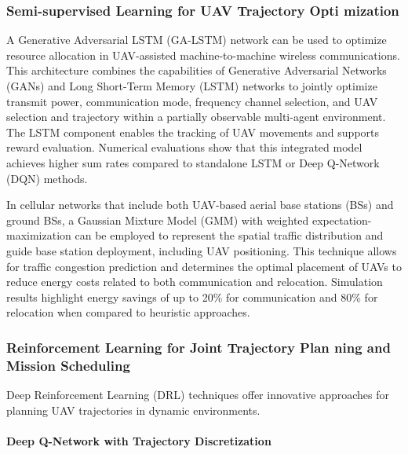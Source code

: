 
\subsubsection{ Semi-supervised Learning for UAV Trajectory Opti
mization}



A Generative Adversarial LSTM (GA-LSTM) network can be used to optimize resource allocation in UAV-assisted machine-to-machine wireless communications. This architecture combines the capabilities of Generative Adversarial Networks (GANs) and Long Short-Term Memory (LSTM) networks to jointly optimize transmit power, communication mode, frequency channel selection, and UAV selection and trajectory within a partially observable multi-agent environment. The LSTM component enables the tracking of UAV movements and supports reward evaluation. Numerical evaluations show that this integrated model achieves higher sum rates compared to standalone LSTM or Deep Q-Network (DQN) methods.

In cellular networks that include both UAV-based aerial base stations (BSs) and ground BSs, a Gaussian Mixture Model (GMM) with weighted expectation-maximization can be employed to represent the spatial traffic distribution and guide base station deployment, including UAV positioning. This technique allows for traffic congestion prediction and determines the optimal placement of UAVs to reduce energy costs related to both communication and relocation. Simulation results highlight energy savings of up to 20\% for communication and 80\% for relocation when compared to heuristic approaches.





\subsubsection{Reinforcement Learning for Joint Trajectory Plan
ning and Mission Scheduling}


Deep Reinforcement Learning (DRL) techniques offer innovative approaches for planning UAV trajectories in dynamic environments.


\paragraph{Deep Q-Network with Trajectory Discretization}




